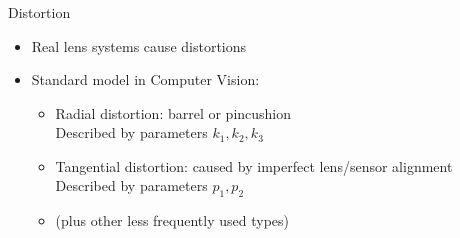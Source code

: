 \documentclass[utf8,stillsansserifmath,fleqn,t]{beamer}
\begin{document}
\begin{frame}
\frametitle{\insertsection}
Distortion
\begin{itemize}
\item Real lens systems cause distortions
\item Standard model in Computer Vision:
    \begin{itemize}
    \item Radial distortion: barrel or pincushion\\
    Described by parameters $k_1, k_2, k_3$
    \item Tangential distortion:  caused by imperfect lens/sensor alignment\\
    Described by parameters $p_1, p_2$
    \item (plus other less frequently used types)
    \end{itemize}
\end{itemize}
\end{frame}
\end{document}
